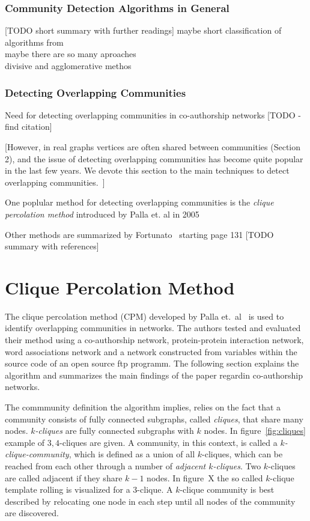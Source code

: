 \documentclass[runningheads,a4paper]{llncs}
\begin{document}
\subsubsection{Community Detection Algorithms in General}
\label{related-communities-general}
[TODO short summary with further readings]
maybe short classification of algorithms from~\cite{fortunato2010community}\\
maybe there are so many aproaches\\
divisive and agglomerative methos\\

\subsubsection{Detecting Overlapping Communities}
\label{related-communities-overlapping}
Need for detecting overlapping communities in co-authorship networks [TODO - find citation]

[However, in real graphs vertices are often shared between communities (Section 2), and the issue of detecting overlapping communities has become quite popular in the last few years. We devote this section to the main techniques to detect overlapping communities.~\cite{fortunato2010community}]

One poplular method for detecting overlapping communities is the \emph{clique percolation method} introduced by Palla et. al in 2005~\cite{palla2005uncovering}

Other methods are summarized by Fortunato~\cite{fortunato2010community} starting page 131 [TODO summary with references]

\section{Clique Percolation Method}
\label{cpm}
The clique percolation method (CPM) developed by Palla et.~al~\cite{palla2007quantifying} is used to identify overlapping communities in networks.
The authors tested and evaluated their method using a co-authorship network, protein-protein interaction network, word associations network and a network constructed from variables within the source code of an open source ftp programm.
The following section explains the algorithm and summarizes the main findings of the paper regardin co-authorship networks.

The commmunity definition the algorithm implies, relies on the fact that a community consists of fully connected subgraphs, called \emph{cliques}, that share many nodes.
\emph{$k$-cliques} are fully connected subgraphs with $k$ nodes.
In figure~\ref{fig:cliques} example of ${3,4}$-cliques are given.
A community, in this context, is called a \emph{$k$-clique-community}, which is defined as a union of all $k$-cliques, which can be reached from each other through a number of \emph{adjacent $k$-cliques}.
Two $k$-cliques are called adjacent if they share $k-1$ nodes.
In figure~X the so called $k$-clique template rolling is visualized for a $3$-clique.
A $k$-clique community is best described by relocating one node in each step until all nodes of the community are discovered.
\end{document}
